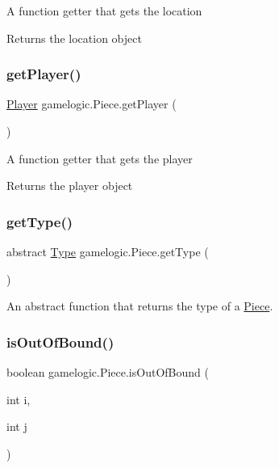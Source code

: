 A function getter that gets the location \begin{DoxyReturn}{Returns}
the location object 
\end{DoxyReturn}
\mbox{\label{classgamelogic_1_1_piece_a8e8a7aef1b872104c0d6dd6c31474794}} 
\subsubsection{\texorpdfstring{get\+Player()}{getPlayer()}}
{\footnotesize\ttfamily \mbox{\hyperlink{classgamelogic_1_1_player}{Player}} gamelogic.\+Piece.\+get\+Player (\begin{DoxyParamCaption}{ }\end{DoxyParamCaption})}

A function getter that gets the player \begin{DoxyReturn}{Returns}
the player object 
\end{DoxyReturn}
\mbox{\label{classgamelogic_1_1_piece_ada7c47c213e0f2271fbab7432cf6de51}} 
\subsubsection{\texorpdfstring{get\+Type()}{getType()}}
{\footnotesize\ttfamily abstract \mbox{\hyperlink{enumgamelogic_1_1_type}{Type}} gamelogic.\+Piece.\+get\+Type (\begin{DoxyParamCaption}{ }\end{DoxyParamCaption})\hspace{0.3cm}{\ttfamily [abstract]}}

An abstract function that returns the type of a \mbox{\hyperlink{classgamelogic_1_1_piece}{Piece}}. \mbox{\label{classgamelogic_1_1_piece_a8a07aab5b997bd7b889e5eb1c72622b0}} 
\subsubsection{\texorpdfstring{is\+Out\+Of\+Bound()}{isOutOfBound()}}
{\footnotesize\ttfamily boolean gamelogic.\+Piece.\+is\+Out\+Of\+Bound (\begin{DoxyParamCaption}\item[{int}]{i,  }\item[{int}]{j }\end{DoxyParamCaption})}


